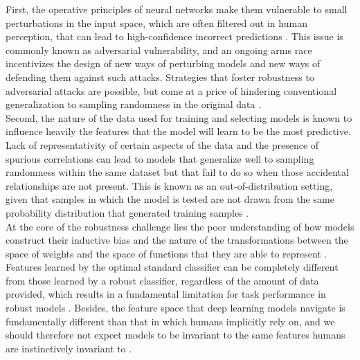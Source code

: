 First, the operative principles of neural networks make them vulnerable
to small perturbations in the input space, which are
often filtered out in human perception, that can lead to high-confidence
incorrect predictions \cite{szegedyIntriguingPropertiesNeural2014}.
This issue is commonly known as adversarial
vulnerability, and an ongoing arms race incentivizes the design 
of new ways of perturbing models and new ways of defending them
against such attacks. Strategies 
that foster robustness to adversarial attacks are possible, but
come at a price of hindering conventional generalization to 
sampling randomness in the original data \cite{tsiprasRobustnessMayBe2019}. \\

Second, the nature of the data used for training and selecting
models is known to influence heavily the features that the model 
will learn to be the most predictive. Lack of representativity of 
certain aspects of the data and the presence of spurious 
correlations can lead to models that generalize well to sampling 
randomness within the same dataset but that fail to do so when those 
accidental relationships are not present. This is known as an
out-of-distribution setting, given that samples in which the model is tested
are not drawn from the same probability distribution that generated
training samples \cite{quinonero-candelaDatasetShiftMachine2009}. \\

At the core of the robustness challenge lies the poor
understanding of how models construct their inductive bias and the nature
of the transformations between the space of weights and the space of 
functions that they are able to represent \cite{jimenezInductiveBiasDeep}. 
Features learned by the optimal standard classifier can be completely 
different from those learned by a robust classifier, regardless 
of the amount of data provided, which results in a fundamental limitation for task 
performance in robust models \cite{tsiprasRobustnessMayBe2019,zhangTheoreticallyPrincipledTradeoff2019}.
Besides, the feature space that deep learning models navigate is fundamentally 
different than that in which humans implicitly rely on, and we 
should therefore not expect models to be invariant to the 
same features humans are instinctively invariant to \cite{ilyasAdversarialExamplesAre2019}. \\

